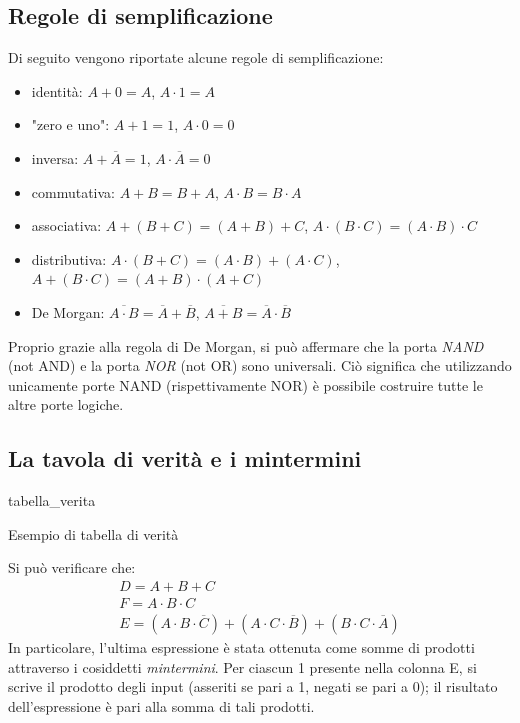 \documentclass[class=book, crop=false]{standalone}
\begin{document}
\subsection{Regole di semplificazione}
\label{subsec:semplificazione}
Di seguito vengono riportate alcune regole di semplificazione:
\begin{itemize}
	\item identità: \(A+0=A\), \(A\cdot 1=A\)
	\item "zero e uno": \(A+1=1\), \(A\cdot 0=0\)
	\item inversa: \(A+\overline{A}=1\), \(A\cdot\overline{A}=0\)
	\item commutativa: \(A+B=B+A\), \(A\cdot B=B\cdot A\)
	\item associativa: \(A+(B+C)=(A+B)+C\), \(A\cdot(B\cdot C)=(A\cdot B)\cdot C\)
	\item distributiva: \(A\cdot(B+C)=(A\cdot B)+(A\cdot C)\), \(A+(B\cdot C)=(A+B)\cdot(A+C)\)
	\item De Morgan: \(\overline{A\cdot B} = \overline{A}+\overline{B}\), \(\overline{A+B} = \overline{A}\cdot\overline{B}\)
\end{itemize}
Proprio grazie alla regola di De Morgan, si può affermare che la porta \emph{NAND} (not AND) e la porta \emph{NOR} (not OR) sono universali. Ciò significa che utilizzando unicamente porte NAND (rispettivamente NOR) è possibile costruire tutte le altre porte logiche.
\subsection{La tavola di verità e i mintermini}
\label{subsec:mintermini}
\begin{table}[!h]
	\centering
	{tabella_verita}
	\caption{Esempio di tabella di verità}
	\label{tabella-verita}
\end{table}
Si può verificare che:
\begin{gather*}
D = A+B+C\\
F = A\cdot B\cdot C\\
E = (A\cdot B\cdot\overline{C}) + (A\cdot C\cdot\overline{B}) + (B\cdot C\cdot\overline{A})
\end{gather*}
In particolare, l'ultima espressione è stata ottenuta come somme di prodotti attraverso i cosiddetti \emph{mintermini}. Per ciascun 1 presente nella colonna E, si scrive il prodotto degli input (asseriti se pari a 1, negati se pari a 0); il risultato dell'espressione è pari alla somma di tali prodotti.
\end{document}

